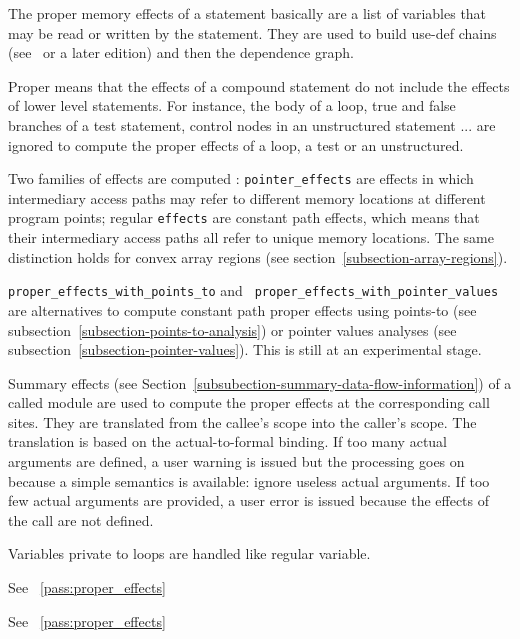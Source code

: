 \documentclass[a4paper]{report}
\newcommand{\PipsPassRef}[1]{\texttt{\detokenize{#1}}~\ref{pass:#1}}
\newenvironment{PipsPass}[1]{\label{pass:#1}}{}
\begin{document}
\begin{PipsPass}{proper_effects}
The proper memory effects of a statement basically are a list of variables
that may be read or written by the statement. They are used to build use-def
chains (see~\cite{ASU86} or a later edition) and then the dependence graph.

Proper means that the effects of a compound statement do not include the
effects of lower level statements. For instance, the body of a loop, true and
false branches of a test statement, control nodes in an unstructured
statement ... are ignored to compute the proper effects of a loop, a
test or an unstructured.

Two families of effects are computed : {\tt pointer\_effects} are
effects in which intermediary access paths may refer to different
memory locations at different program points; regular {\tt effects}
are constant path effects, which means that their intermediary access
paths all refer to unique memory locations. The same distinction holds
for convex array regions (see section~\ref{subsection-array-regions}).

{\tt proper\_effects\_with\_points\_to} and {\tt
  proper\_effects\_with\_pointer\_values} are alternatives to compute
constant path proper effects using points-to (see
subsection~\ref{subsection-points-to-analysis}) or pointer values
analyses (see subsection~\ref{subsection-pointer-values}). This is
still at an experimental stage.

Summary effects (see
Section~\ref{subsubection-summary-data-flow-information}) of a called
module are used to compute the proper effects at the corresponding
call sites. They are translated from the callee's scope into the
caller's scope. The translation is based on the actual-to-formal
binding. If too many actual arguments are defined, a user warning is
issued but the processing goes on because a simple semantics is
available: ignore useless actual arguments. If too few actual
arguments are provided, a user error is issued because the effects of
the call are not defined.

Variables private to loops are handled like regular variable.
\end{PipsPass}


\begin{PipsPass}{proper_pointer_effects}
 See \PipsPassRef{proper_effects}
\end{PipsPass}

\begin{PipsPass}{proper_effects_with_points_to}
 See \PipsPassRef{proper_effects}
\end{PipsPass}
\end{document}
